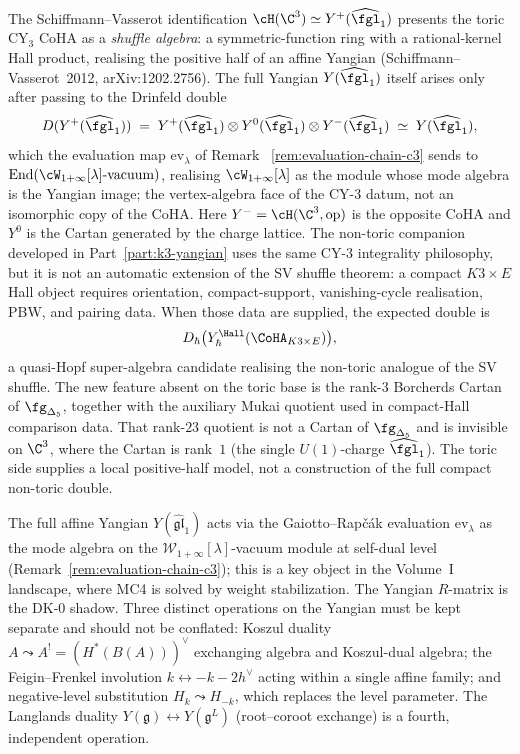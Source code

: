 \begin{remark}
\label{rem:tcy3-coha-structure}
The Schiffmann--Vasserot identification $\cH(\C^3) \simeq Y^+(\widehat{\fgl}_1)$ presents the toric CY$_3$ CoHA as a \emph{shuffle algebra}: a symmetric-function ring with a rational-kernel Hall product, realising the positive half of an affine Yangian (Schiffmann--Vasserot~2012, arXiv:1202.2756). The full Yangian $Y(\widehat{\fgl}_1)$ itself arises only after passing to the Drinfeld double
\[
 D(Y^+(\widehat{\fgl}_1))
 \;=\; Y^+(\widehat{\fgl}_1) \otimes Y^0(\widehat{\fgl}_1) \otimes Y^-(\widehat{\fgl}_1)
 \;\simeq\; Y(\widehat{\fgl}_1),
\]
which the evaluation map $\mathrm{ev}_\lambda$ of Remark~%
\ref{rem:evaluation-chain-c3} sends to
$\mathrm{End}(\cW_{1+\infty}[\lambda]\text{-vacuum})$, realising
$\cW_{1+\infty}[\lambda]$ as the module whose mode algebra is the
Yangian image; the vertex-algebra face of the CY-$3$ datum, not an
isomorphic copy of the CoHA. Here $Y^- = \cH(\C^3,\mathrm{op})$ is the
opposite CoHA and $Y^0$ is the Cartan generated by the charge lattice.
The non-toric companion developed in Part~\ref{part:k3-yangian} uses
the same CY-$3$ integrality philosophy, but it is not
an automatic extension of the SV shuffle theorem: a compact
$K3\times E$ Hall object requires orientation, compact-support,
vanishing-cycle realisation, PBW, and pairing data. When those data are
supplied, the expected double is
\[
 D_{\hbar}\bigl( Y^{\Hall}_{\hbar}( \CoHA_{K3 \times E} ) \bigr),
\]
a quasi-Hopf super-algebra candidate realising the non-toric analogue of
the SV shuffle. The new feature absent on the toric base is the
rank-$3$ Borcherds Cartan of \(\fg_{\Delta_5}\), together with the
auxiliary Mukai quotient used in compact-Hall comparison data. That
rank-$23$ quotient is not a Cartan of \(\fg_{\Delta_5}\) and is
invisible on \(\C^3\), where the Cartan is rank~$1$ (the single
\(U(1)\)-charge \(\widehat{\fgl}_1\)). The toric side supplies a local
positive-half model, not a construction of the full compact non-toric
double.
\end{remark}

The full affine Yangian $Y(\widehat{\mathfrak{gl}}_1)$ acts via the Gaiotto--Rap\v{c}\'ak evaluation $\mathrm{ev}_\lambda$ as the mode algebra on the $\mathcal{W}_{1+\infty}[\lambda]$-vacuum module at self-dual level (Remark~\ref{rem:evaluation-chain-c3}); this is a key object in the Volume~I landscape, where MC4 is solved by weight stabilization. The Yangian $R$-matrix is the DK-0 shadow. Three distinct operations on the Yangian must be kept separate and should not be conflated: Koszul duality $A \leadsto A^! = (H^*(B(A)))^\vee$ exchanging algebra and Koszul-dual algebra; the Feigin--Frenkel involution $k \leftrightarrow -k - 2 h^\vee$ acting within a single affine family; and negative-level substitution $H_k \leadsto H_{-k}$, which replaces the level parameter. The Langlands duality $Y(\mathfrak{g}) \leftrightarrow Y(\mathfrak{g}^L)$ (root--coroot exchange) is a fourth, independent operation.


